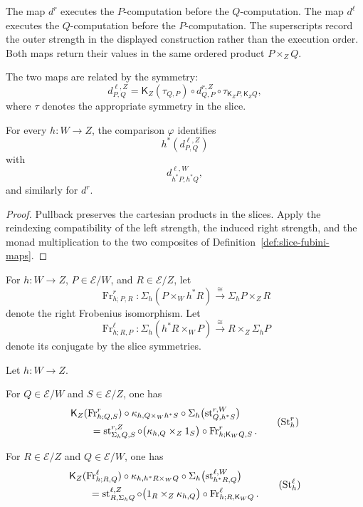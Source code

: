 The map \(d^r\) executes the \(P\)-computation before the
\(Q\)-computation.  The map \(d^\ell\) executes the \(Q\)-computation before
the \(P\)-computation.  The superscripts record the outer strength in the
displayed construction rather than the execution order.  Both maps return
their values in the same ordered product \(P\times_ZQ\).

The two maps are related by the symmetry:
\[
    d^{\ell,Z}_{P,Q}
    =
    \mathsf K_Z(\tau_{Q,P})
    \circ
    d^{r,Z}_{Q,P}
    \circ
    \tau_{\mathsf K_ZP,\mathsf K_ZQ},
\]
where \(\tau\) denotes the appropriate symmetry in the slice.

\begin{proposition}
\label{prop:fubini-reindexing}
For every \(h:W\to Z\), the comparison \(\varphi\) identifies
\[
    h^*(d^{\ell,Z}_{P,Q})
\]
with
\[
    d^{\ell,W}_{h^*P,h^*Q},
\]
and similarly for \(d^r\).
\end{proposition}

\begin{proof}
Pullback preserves the cartesian products in the slices.  Apply the
reindexing compatibility of the left strength, the induced right strength,
and the monad multiplication to the two composites of
Definition~\ref{def:slice-fubini-maps}.
\end{proof}

For \(h:W\to Z\), \(P\in\mathcal E/W\), and \(R\in\mathcal E/Z\), let
\[
    \operatorname{Fr}^{r}_{h;P,R}:
    \Sigma_h(P\times_Wh^*R)
    \xrightarrow{\cong}
    \Sigma_hP\times_ZR
\]
denote the right Frobenius isomorphism.  Let
\[
    \operatorname{Fr}^{\ell}_{h;R,P}:
    \Sigma_h(h^*R\times_WP)
    \xrightarrow{\cong}
    R\times_Z\Sigma_hP
\]
denote its conjugate by the slice symmetries.

\begin{lemma}
\label{lem:dependent-sum-strength-compatibility}
Let \(h:W\to Z\).

For \(Q\in\mathcal E/W\) and \(S\in\mathcal E/Z\), one has
\[
\begin{aligned}
&
\mathsf K_Z(\operatorname{Fr}^{r}_{h;Q,S})
\circ
\kappa_{h,Q\times_Wh^*S}
\circ
\Sigma_h
\bigl(
    \operatorname{st}^{r,W}_{Q,h^*S}
\bigr)
\\
&\qquad=
\operatorname{st}^{r,Z}_{\Sigma_hQ,S}
\circ
\bigl(
    \kappa_{h,Q}\times_Z1_S
\bigr)
\circ
\operatorname{Fr}^{r}_{h;\mathsf K_WQ,S}.
\end{aligned}
\tag{\(\mathrm{St}^r_h\)}
\]

For \(R\in\mathcal E/Z\) and \(Q\in\mathcal E/W\), one has
\[
\begin{aligned}
&
\mathsf K_Z(\operatorname{Fr}^{\ell}_{h;R,Q})
\circ
\kappa_{h,h^*R\times_WQ}
\circ
\Sigma_h
\bigl(
    \operatorname{st}^{\ell,W}_{h^*R,Q}
\bigr)
\\
&\qquad=
\operatorname{st}^{\ell,Z}_{R,\Sigma_hQ}
\circ
\bigl(
    1_R\times_Z\kappa_{h,Q}
\bigr)
\circ
\operatorname{Fr}^{\ell}_{h;R,\mathsf K_WQ}.
\end{aligned}
\tag{\(\mathrm{St}^\ell_h\)}
\]
\end{lemma}

